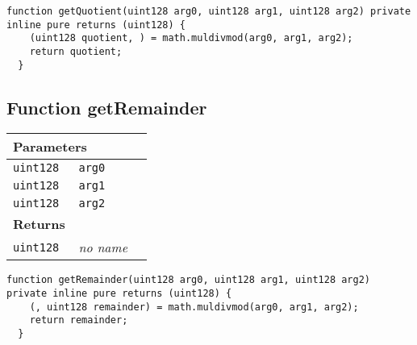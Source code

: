 \vspace{2cm}

\begin{lstlisting}[firstnumber=48]
  function getQuotient(uint128 arg0, uint128 arg1, uint128 arg2) private inline pure returns (uint128) {
    (uint128 quotient, ) = math.muldivmod(arg0, arg1, arg2);
    return quotient;
  }
\end{lstlisting}

\subsection{Function getRemainder}


\ifsoltables
\noindent\begin{tabular}{|l|l|p{5cm}|}\hline
\multicolumn{3}{|l|}{\bf Parameters}\\\hline
\tt uint128 & \tt arg0 &\\\hline
\tt uint128 & \tt arg1 &\\\hline
\tt uint128 & \tt arg2 &\\\hline
\multicolumn{3}{|l|}{\bf Returns}\\\hline
\tt uint128 & {\em no name} &\\\hline
\end{tabular}
\fi

\vspace{2cm}

\begin{lstlisting}[firstnumber=54]
  function getRemainder(uint128 arg0, uint128 arg1, uint128 arg2) private inline pure returns (uint128) {
    (, uint128 remainder) = math.muldivmod(arg0, arg1, arg2);
    return remainder;
  }
\end{lstlisting}
